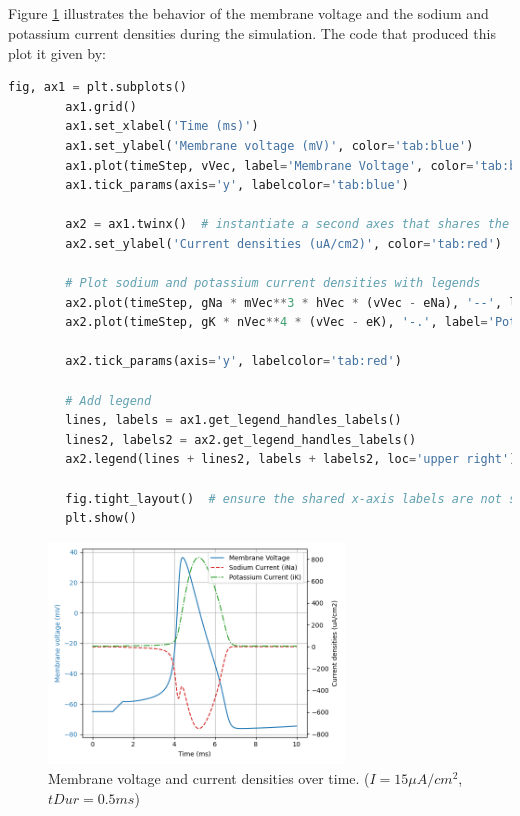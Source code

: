 \documentclass{article}
\begin{document}
    \subsection{}

    Figure \ref{fig:membrane_voltage_currents} illustrates the behavior of the membrane voltage and the sodium and potassium current densities during the simulation.
    The code that produced this plot it given by:

    \begin{lstlisting}[language=Python, style=mystyle]
        fig, ax1 = plt.subplots()
        ax1.grid()
        ax1.set_xlabel('Time (ms)')
        ax1.set_ylabel('Membrane voltage (mV)', color='tab:blue')
        ax1.plot(timeStep, vVec, label='Membrane Voltage', color='tab:blue')
        ax1.tick_params(axis='y', labelcolor='tab:blue')

        ax2 = ax1.twinx()  # instantiate a second axes that shares the same x-axis
        ax2.set_ylabel('Current densities (uA/cm2)', color='tab:red')

        # Plot sodium and potassium current densities with legends
        ax2.plot(timeStep, gNa * mVec**3 * hVec * (vVec - eNa), '--', label='Sodium Current (iNa)', color='tab:red')
        ax2.plot(timeStep, gK * nVec**4 * (vVec - eK), '-.', label='Potassium Current (iK)', color='tab:green')

        ax2.tick_params(axis='y', labelcolor='tab:red')

        # Add legend
        lines, labels = ax1.get_legend_handles_labels()
        lines2, labels2 = ax2.get_legend_handles_labels()
        ax2.legend(lines + lines2, labels + labels2, loc='upper right')

        fig.tight_layout()  # ensure the shared x-axis labels are not slightly cut off
        plt.show()
    \end{lstlisting}

    \begin{figure}[h]
        \centering
        \includegraphics[width=0.7\textwidth]{channel_activation.png}
        \caption{Membrane voltage and current densities over time. ($I = 15 \mu A/cm^2$, $tDur = 0.5 ms$)}
        \label{fig:membrane_voltage_currents}
    \end{figure}
\end{document}
